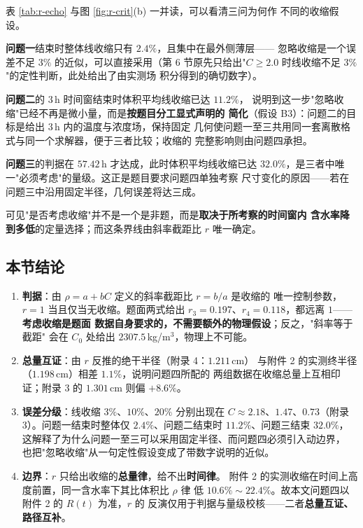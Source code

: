 \documentclass[12pt,a4paper,fontset=none]{ctexart}
\begin{document}
表 \ref{tab:r-echo} 与图 \ref{fig:r-crit}(b) 一并读，可以看清三问为何作
不同的收缩假设。

\textbf{问题一}结束时整体线收缩只有 $2.4\%$，且集中在最外侧薄层——
忽略收缩是一个误差不足 $3\%$ 的近似，可以直接采用（第 6 节原先只给出"$C\ge2.0$ 时线收缩不足 $3\%$"的定性判断，此处给出了由实测场
积分得到的确切数字）。

\textbf{问题二}的 $3$\,h 时间窗结束时体积平均线收缩已达 $11.2\%$，
说明到这一步"忽略收缩"已经不再是微小量，而是\textbf{按题目分工显式声明的
简化}（假设 B3）：问题二的目标是给出 $3$\,h 内的温度与浓度场，保持固定
几何使问题一至三共用同一套离散格式与同一个求解器，便于三者比较；收缩的
完整影响则由问题四承担。

\textbf{问题三}的判据在 $57.42$\,h 才达成，此时体积平均线收缩已达
$32.0\%$，是三者中唯一"必须考虑"的量级。这正是题目要求问题四单独考察
尺寸变化的原因——若在问题三中沿用固定半径，几何误差将达三成。

可见"是否考虑收缩"并不是一个是非题，而是\textbf{取决于所考察的时间窗内
含水率降到多低}的定量选择；而这条界线由斜率截距比 $r$ 唯一确定。

\subsection{本节结论}

\begin{enumerate}
  \item \textbf{判据}：由 $\rho=a+bC$ 定义的斜率截距比 $r=b/a$ 是收缩的
        唯一控制参数，$r=1$ 当且仅当无收缩。题面两式给出
        $r_3=0.197$、$r_4=0.118$，都远离 $1$——\textbf{考虑收缩是题面
        数据自身要求的，不需要额外的物理假设}；反之，"斜率等于截距"
        会在 $C_0$ 处给出 $2307.5$\,kg/m$^3$，物理上不可能。
  \item \textbf{总量互证}：由 $r$ 反推的绝干半径（附录 4：$1.211$\,cm）
        与附件 2 的实测终半径（$1.198$\,cm）相差 $1.1\%$，说明问题四所配的
        两组数据在收缩总量上互相印证；附录 3 的 $1.301$\,cm 则偏 $+8.6\%$。
  \item \textbf{误差分级}：线收缩 $3\%$、$10\%$、$20\%$ 分别出现在
        $C\approx2.18$、$1.47$、$0.73$（附录 3）。问题一结束时整体仅
        $2.4\%$、问题二结束时 $11.2\%$、问题三结束 $32.0\%$，
        这解释了为什么问题一至三可以采用固定半径、而问题四必须引入动边界，
        也把"忽略收缩"从一句定性假设变成了带数字说明的近似。
  \item \textbf{边界}：$r$ 只给出收缩的\textbf{总量律}，给不出\textbf{时间律}。
        附件 2 的实测收缩在时间上高度前置，同一含水率下其比体积比 $\rho$ 律
        低 $10.6\%\sim22.4\%$。故本文问题四以附件 2 的 $R(t)$ 为准，$r$ 的
        反演仅用于判据与量级校核——二者\textbf{总量互证、路径互补}。
\end{enumerate}
\end{document}
